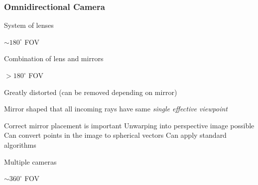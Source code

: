 \subsubsection{Omnidirectional Camera}
\begin{itemize}
        \begin{itemize*}
            \item System of lenses
            \item $\sim 180^\circ$ FOV
        \end{itemize*}
        \begin{itemize*}
            \item Combination of lens and mirrors
            \item $> 180^\circ$ FOV
            \item Greatly distorted (can be removed depending on mirror)
        \end{itemize*}
        \begin{itemize}
             Mirror shaped that all incoming rays have same \textit{single effective viewpoint}
                \begin{itemize}
                    \ides Correct mirror placement is important
                    \ipro Unwarping into perspective image possible
                    \ipro Can convert points in the image to spherical vectors
                    \ipro Can apply standard algorithms
                \end{itemize}
        \end{itemize}
        \begin{itemize*}
            \item Multiple cameras
            \item $\sim 360^\circ$ FOV
        \end{itemize*}
\end{itemize}


